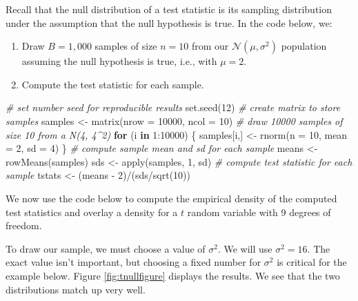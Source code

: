 \documentclass[
]{book}
\newenvironment{Shaded}{\begin{snugshade}}{\end{snugshade}}
\newcommand{\AttributeTok}[1]{\textcolor[rgb]{0.77,0.63,0.00}{#1}}
\newcommand{\CommentTok}[1]{\textcolor[rgb]{0.56,0.35,0.01}{\textit{#1}}}
\newcommand{\ControlFlowTok}[1]{\textcolor[rgb]{0.13,0.29,0.53}{\textbf{#1}}}
\newcommand{\DecValTok}[1]{\textcolor[rgb]{0.00,0.00,0.81}{#1}}
\newcommand{\FunctionTok}[1]{\textcolor[rgb]{0.00,0.00,0.00}{#1}}
\newcommand{\NormalTok}[1]{#1}
\newcommand{\OtherTok}[1]{\textcolor[rgb]{0.56,0.35,0.01}{#1}}
\newcommand{\SpecialCharTok}[1]{\textcolor[rgb]{0.00,0.00,0.00}{#1}}
\providecommand{\tightlist}{%
  \setlength{\itemsep}{0pt}\setlength{\parskip}{0pt}}
\theoremstyle{definition}
\theoremstyle{definition}
\theoremstyle{definition}
\theoremstyle{definition}
\theoremstyle{remark}
\begin{document}
Recall that the null distribution of a test statistic is its sampling distribution under the assumption that the null hypothesis is true. In the code below, we:

\begin{enumerate}
\def\labelenumi{\arabic{enumi}.}
\tightlist
\item
  Draw \(B=1,000\) samples of size \(n=10\) from our \(\mathcal{N}(\mu,\sigma^2)\) population assuming the null hypothesis is true, i.e., with \(\mu = 2\).
\item
  Compute the test statistic for each sample.
\end{enumerate}

\begin{Shaded}
\begin{Highlighting}[]
\CommentTok{\# set number seed for reproducible results}
\FunctionTok{set.seed}\NormalTok{(}\DecValTok{12}\NormalTok{)}
\CommentTok{\# create matrix to store samples}
\NormalTok{samples }\OtherTok{\textless{}{-}} \FunctionTok{matrix}\NormalTok{(}\AttributeTok{nrow =} \DecValTok{10000}\NormalTok{, }\AttributeTok{ncol =} \DecValTok{10}\NormalTok{)}
\CommentTok{\# draw 10000 samples of size 10 from a N(4, 4\^{}2)}
\ControlFlowTok{for}\NormalTok{ (i }\ControlFlowTok{in} \DecValTok{1}\SpecialCharTok{:}\DecValTok{10000}\NormalTok{) \{}
\NormalTok{  samples[i,] }\OtherTok{\textless{}{-}} \FunctionTok{rnorm}\NormalTok{(}\AttributeTok{n =} \DecValTok{10}\NormalTok{, }\AttributeTok{mean =} \DecValTok{2}\NormalTok{, }\AttributeTok{sd =} \DecValTok{4}\NormalTok{)}
\NormalTok{\}}
\CommentTok{\# compute sample mean and sd for each sample}
\NormalTok{means }\OtherTok{\textless{}{-}}  \FunctionTok{rowMeans}\NormalTok{(samples)}
\NormalTok{sds }\OtherTok{\textless{}{-}} \FunctionTok{apply}\NormalTok{(samples, }\DecValTok{1}\NormalTok{, sd)}
\CommentTok{\# compute test statistic for each sample}
\NormalTok{tstats }\OtherTok{\textless{}{-}}\NormalTok{ (means }\SpecialCharTok{{-}} \DecValTok{2}\NormalTok{)}\SpecialCharTok{/}\NormalTok{(sds}\SpecialCharTok{/}\FunctionTok{sqrt}\NormalTok{(}\DecValTok{10}\NormalTok{))}
\end{Highlighting}
\end{Shaded}

We now use the code below to compute the empirical density of the computed test statistics and overlay a density for a \(t\) random variable with 9 degrees of freedom.

To draw our sample, we must choose a value of \(\sigma^2\). We will use \(\sigma^2 = 16\). The exact value isn't important, but choosing a fixed number for \(\sigma^2\) is critical for the example below. Figure \ref{fig:tnullfigure} displays the results. We see that the two distributions match up very well.
\end{document}
